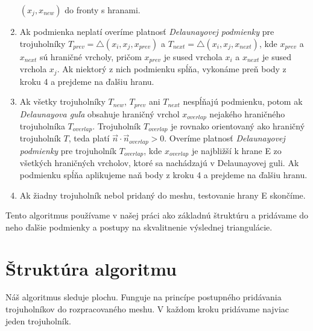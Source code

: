 \begin{enumerate}
{\begin{itemize}
{        $(x_j, x_{new})$ do fronty s hranami.}
    \end{itemize}
    }
    \item{
        Ak podmienka neplatí overíme platnosť \textit{Delaunayovej podmienky} pre trojuholníky 
        $T_{prev} = \bigtriangleup(x_i, x_j, x_{prev})$ a 
        $T_{next} = \bigtriangleup(x_i, x_j, x_{next})$, kde 
        $x_{prev}$ a $x_{next}$ sú hraničné vrcholy,
        pričom $x_{prev}$ 
        je sused vrchola $x_i$ a $x_{next}$ je sused vrchola 
        $x_j$. Ak niektorý z nich podmienku
        spĺňa, vykonáme preň body z kroku 4 a prejdeme na ďalšiu hranu.
    }
    \item{
        Ak všetky trojuholníky $T_{new}$, $T_{prev}$ ani $T_{next}$ nespĺňajú podmienku, potom 
        ak \textit{Delaunayova guľa} obsahuje hraničný vrchol $x_{overlap}$ nejakého hraničného 
        trojuholníka $T_{overlap}$. Trojuholník $T_{overlap}$ je rovnako orientovaný ako hraničný 
        trojuholník $T$, teda platí $\vec{n} \cdot \vec{n}_{overlap} > 0$. 
        Overíme platnosť \textit{Delaunayovej podmienky} pre 
        trojuholník $T_{overlap}$, kde $x_{overlap}$ je najbližší k hrane E zo všetkých hraničných
        vrcholov, ktoré sa nachádzajú v Delaunayovej guli. Ak podmienku spĺňa aplikujeme naň body z 
        kroku 4 a prejdeme na ďalšiu hranu.
    }
    \item{
        Ak žiadny trojuholník nebol pridaný do meshu, testovanie hrany E skončíme.
    }
\end{enumerate}

Tento algoritmus používame v našej práci ako základnú štruktúru a pridávame do neho ďalšie podmienky 
a postupy na skvalitnenie výslednej triangulácie. 

\section {Štruktúra algoritmu}
\label{kap:first_part_of_algorithm}

Náš algoritmus sleduje plochu.
Funguje na princípe postupného pridávania trojuholníkov do rozpracovaného meshu. V každom kroku
pridávame najviac jeden trojuholník.

